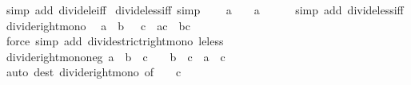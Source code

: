 \begin{isabellebody}
\ {\isacharparenleft}{\kern0pt}simp\ add{\isacharcolon}{\kern0pt}\ divide{\isacharunderscore}{\kern0pt}le{\isacharunderscore}{\kern0pt}{}{\isacharunderscore}{\kern0pt}iff{\isacharparenright}{\kern0pt}%
\endisatagproof
{\isafoldproof}%
%
\isadelimproof
\isanewline
%
\endisadelimproof
\isanewline
{}\isamarkupfalse%
\ divide{\isacharunderscore}{\kern0pt}less{\isacharunderscore}{\kern0pt}{}{\isacharunderscore}{\kern0pt}{}{\isacharunderscore}{\kern0pt}iff\ {\isacharbrackleft}{\kern0pt}simp{\isacharbrackright}{\kern0pt}{\isacharcolon}{\kern0pt}\isanewline
\ \ {\isachardoublequoteopen}{}\ {\isacharslash}{\kern0pt}\ a\ {\isacharless}{\kern0pt}\ {}\ {\isasymlongleftrightarrow}\ a\ {\isacharless}{\kern0pt}\ {}{\isachardoublequoteclose}\isanewline
%
\isadelimproof
\ \ %
\endisadelimproof
%
\isatagproof
{}\isamarkupfalse%
\ {\isacharparenleft}{\kern0pt}simp\ add{\isacharcolon}{\kern0pt}\ divide{\isacharunderscore}{\kern0pt}less{\isacharunderscore}{\kern0pt}{}{\isacharunderscore}{\kern0pt}iff{\isacharparenright}{\kern0pt}%
\endisatagproof
{\isafoldproof}%
%
\isadelimproof
\isanewline
%
\endisadelimproof
\isanewline
{}\isamarkupfalse%
\ divide{\isacharunderscore}{\kern0pt}right{\isacharunderscore}{\kern0pt}mono{\isacharcolon}{\kern0pt}\isanewline
\ \ {\isachardoublequoteopen}{\isasymlbrakk}a\ {\isasymle}\ b{\isacharsemicolon}{\kern0pt}\ {}\ {\isasymle}\ c{\isasymrbrakk}\ {\isasymLongrightarrow}\ a{\isacharslash}{\kern0pt}c\ {\isasymle}\ b{\isacharslash}{\kern0pt}c{\isachardoublequoteclose}\isanewline
%
\isadelimproof
\ \ %
\endisadelimproof
%
\isatagproof
{}\isamarkupfalse%
\ {\isacharparenleft}{\kern0pt}force\ simp\ add{\isacharcolon}{\kern0pt}\ divide{\isacharunderscore}{\kern0pt}strict{\isacharunderscore}{\kern0pt}right{\isacharunderscore}{\kern0pt}mono\ le{\isacharunderscore}{\kern0pt}less{\isacharparenright}{\kern0pt}%
\endisatagproof
{\isafoldproof}%
%
\isadelimproof
\isanewline
%
\endisadelimproof
\isanewline
{}\isamarkupfalse%
\ divide{\isacharunderscore}{\kern0pt}right{\isacharunderscore}{\kern0pt}mono{\isacharunderscore}{\kern0pt}neg{\isacharcolon}{\kern0pt}\ {\isachardoublequoteopen}a\ {\isasymle}\ b\ {\isasymLongrightarrow}\ c\ {\isasymle}\ {}\ {\isasymLongrightarrow}\ b\ {\isacharslash}{\kern0pt}\ c\ {\isasymle}\ a\ {\isacharslash}{\kern0pt}\ c{\isachardoublequoteclose}\isanewline
%
\isadelimproof
\ \ %
\endisadelimproof
%
\isatagproof
{}\isamarkupfalse%
\ {\isacharparenleft}{\kern0pt}auto\ dest{\isacharcolon}{\kern0pt}\ divide{\isacharunderscore}{\kern0pt}right{\isacharunderscore}{\kern0pt}mono\ {\isacharbrackleft}{\kern0pt}of\ {\isacharunderscore}{\kern0pt}\ {\isacharunderscore}{\kern0pt}\ {\isachardoublequoteopen}{\isacharminus}{\kern0pt}\ c{\isachardoublequoteclose}{\isacharbrackright}{\kern0pt}{\isacharparenright}{\kern0pt}%

\end{isabellebody}
